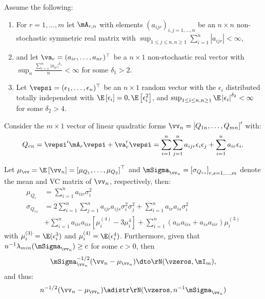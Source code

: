 \documentclass[english,12pt]{book}\usepackage[]{graphicx}\usepackage[]{xcolor}
\begin{document}
\begin{theorem}\label{teo:clt_quadratic}
		Assume the following:
		\begin{enumerate}
			\item For $r = 1,\ldots, m$ let $\mA_{r,n}$ with elements $(a_{ijr})_{i,j = 1, \ldots,n}$ be an $n\times n$ non-stochastic symmetric real matrix with $\sup_{1\leq j \leq n, n\geq 1}\sum_{i = 1}^n|a_{ijr}| < \infty$,
			\item and let $\va_r = (a_{ir},\ldots ,a_{nr})^\top$ be a $n \times 1$ non-stochastic real vector with $\sup_{n}\frac{\sum_{i=1}^n \left|a_{ir}\right|^{\delta_1}}{n}<\infty$ for some $\delta_1 > 2$.
			\item Let $\vepsi = (\epsilon_1,\ldots ,\epsilon_n)^\top$ be an $n \times 1$ random vector with the $\epsilon_i$ distributed totally independent with $\E\left[\epsilon_i\right] = 0, \E\left[\epsilon_i^2\right]$, and  $\sup_{1 \leq i \leq n, n \geq 1}\E\left|\epsilon_{i}\right|^{\delta_2}<\infty$ for some $\delta_2 >4$. 
		\end{enumerate}
		Consider the $m \times 1$ vector of linear quadratic forms $\vv_n = \left[Q_{1n},\ldots, Q_{mn}\right]'$ with:
		\begin{equation*}
			Q_{rn}= \vepsi'\mA_r\vepsi + \va_r'\vepsi = \sum_{i=1}^n\sum_{j=1}^na_{ijr}\epsilon_i\epsilon_j + \sum_{i=1}^na_{ir}\epsilon_i.
		\end{equation*}
		
		Let $\mu_{\vv} = \E\left[\vv_n\right] = \left[\mu_{Q_1},\ldots,\mu_{Q_2}\right]^\top$ and $\mSigma_{\vv_n} =\left[\sigma_{Q_{rs}}\right]_{r,s =1,\ldots,m}$ denote the mean and VC matrix of $\vv_n$, respectively, then:
		\begin{equation*}
			\begin{aligned}
			\mu_{Q_r} & = \sum_{i = 1}^na_{iir}\sigma_i^2 \\
			 \sigma_{Q_{rs}} & = 2\sum_{i=1}^n\sum_{j =1}^na_{ijr}a_{ijs}\sigma^2_i\sigma_j^2 + \sum_{i = 1}^na_{ir}a_{is}\sigma_i^2 \\
			 	            & + \sum_{i = 1}^na_{iir}a_{iis}\left[\mu_i^{(4)} - 3\mu_i^{4}\right] + \sum_{i =1}^n(a_{ir}a_{iis} + a_{is}a_{iir})\mu_i^{(3)}
			\end{aligned}
		\end{equation*}
		with $\mu_i^{(3)} = \E(\epsilon_i^3)$ and $\mu_i^{(4)} = \E(\epsilon_i^4)$. Furthermore, given that $n^{-1}\lambda_{min}(\mSigma_{\vv_n})\geq c$ for some $c > 0$, then
		\begin{equation*}
		\mSigma_{\vv_n} ^{-1/2}(\vv_n - \mu_{\vv_n})\dto \rN(\vzeros, \mI_m),
		\end{equation*}
		and thus:
		\begin{equation*}
			n^{-1/2}(\vv_n - \mu_{\vv_n}) \adistr \rN(\vzeros, n^{-1}\mSigma_{\vv_n})
		\end{equation*}
\end{theorem}	
\end{document}
